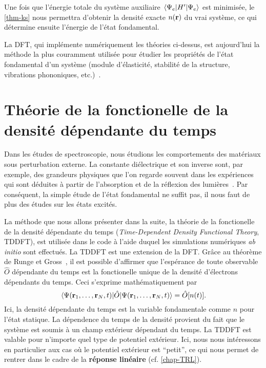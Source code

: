 Une fois que l'énergie totale du système auxiliaire $\ev{H'}{\Psi_e}$ est minimisée,
le \cref{thm-ks} nous permettra d'obtenir la densité exacte $n(\vb{r})$ du vrai système,
ce qui détermine ensuite l'énergie de l'état fondamental.

La DFT, qui implémente numériquement les théories ci-dessus,
est aujourd'hui la méthode la plus couramment utilisée pour étudier
les propriétés de l'état fondamental d'un système
(module d'élasticité, stabilité de la structure, vibrations phononiques, etc.)~\cite{Martin2004}.

\section[TDDFT]{Théorie de la fonctionelle de la densité dépendante du temps}
\label{sec-TDDFT}
Dans les études de spectroscopie,
nous étudions les comportements des matériaux sous perturbation externe.
La constante diélectrique et son inverse sont, par exemple,
des grandeurs physiques que l'on regarde souvent dans les expériences
qui sont déduites à partir de l'absorption et de la réflexion des lumières~\cite{Sottile2003}.
Par conséquent, la simple étude de l'état fondamental ne suffit pas,
il nous faut de plus des études sur les états excités.

La méthode que nous allons présenter dans la suite,
la théorie de la fonctionelle de la densité dépendante du temps
(\textit{Time-Dependent Density Functional Theory}, TDDFT),
est utilisée dans le code à l'aide duquel les simulations numériques \textit{ab initio} sont effectués.
La TDDFT est une extension de la DFT\@.
Grâce au théorème de Runge et Gross~\cite{Runge1984},
il est possible d'affirmer que l'espérance de toute observable $\hat{O}$ dépendante du temps
est la fonctionelle unique de la densité d'électrons dépendants du temps.
Ceci s'exprime mathématiquement par
\begin{equation}
  \ev{\hat{O}}{\Psi(\vb{r}_1, \ldots, \vb{r}_N, t)} = \hat{O}[n(t)].
\end{equation}
Ici, la densité dépendante du temps est la variable fondamentale comme $n$ pour l'état statique.
La dépendence du temps de la densité provient du fait que le système est soumis à un champ extérieur dépendant du temps.
La TDDFT est valable pour n'importe quel type de potentiel extérieur.
Ici, nous nous intéressons en particulier aux cas où le potentiel extérieur est ``petit'',
ce qui nous permet de rentrer dans le cadre de la \textbf{réponse linéaire} (cf. \cref{chap-TRL}).

